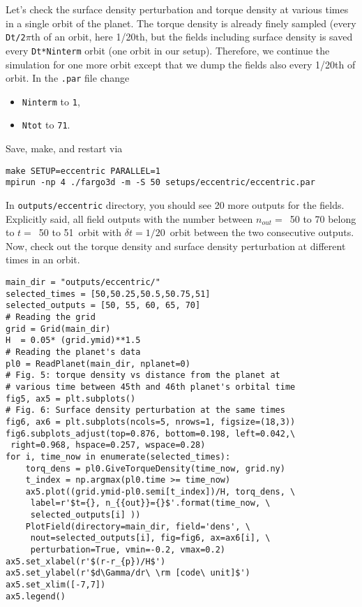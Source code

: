 \documentclass[14pt]{scrartcl}
\begin{document}
Let's check the surface density perturbation and torque density at various times in a single orbit of the planet. The torque density is already finely sampled (every \texttt{Dt/2$\pi$}th of an orbit, here 1/20th, but the fields including surface density is saved every \texttt{Dt*Ninterm} orbit (one orbit in our setup). Therefore, we continue the simulation for one more orbit except that we dump the fields also every 1/20th of orbit. In the \texttt{.par} file change
\begin{itemize}
	\item \texttt{Ninterm} to \texttt{1},
	\item \texttt{Ntot} to \texttt{71}.
\end{itemize} 
Save, make, and restart via 
\begin{verbatim}
make SETUP=eccentric PARALLEL=1
mpirun -np 4 ./fargo3d -m -S 50 setups/eccentric/eccentric.par
\end{verbatim}

In \texttt{outputs/eccentric} directory, you should see 20 more outputs for the fields. Explicitly said, all field outputs with the number between $n_{out}=$~50 to 70 belong to $t=$~50 to 51~orbit with $\delta t=1/20$~orbit between the two consecutive outputs. Now, check out the torque density and surface density perturbation at different times in an orbit.
	\begin{verbatim}
main_dir = "outputs/eccentric/"
selected_times = [50,50.25,50.5,50.75,51]
selected_outputs = [50, 55, 60, 65, 70]
# Reading the grid
grid = Grid(main_dir)
H  = 0.05* (grid.ymid)**1.5
# Reading the planet's data
pl0 = ReadPlanet(main_dir, nplanet=0)
# Fig. 5: torque density vs distance from the planet at 
# various time between 45th and 46th planet's orbital time
fig5, ax5 = plt.subplots()
# Fig. 6: Surface density perturbation at the same times
fig6, ax6 = plt.subplots(ncols=5, nrows=1, figsize=(18,3))
fig6.subplots_adjust(top=0.876, bottom=0.198, left=0.042,\
 right=0.968, hspace=0.257, wspace=0.28)
for i, time_now in enumerate(selected_times):
    torq_dens = pl0.GiveTorqueDensity(time_now, grid.ny)
    t_index = np.argmax(pl0.time >= time_now)
    ax5.plot((grid.ymid-pl0.semi[t_index])/H, torq_dens, \
     label=r'$t={}, n_{{out}}={}$'.format(time_now, \
     selected_outputs[i] ))
    PlotField(directory=main_dir, field='dens', \
     nout=selected_outputs[i], fig=fig6, ax=ax6[i], \
     perturbation=True, vmin=-0.2, vmax=0.2)
ax5.set_xlabel(r'$(r-r_{p})/H$')
ax5.set_ylabel(r'$d\Gamma/dr\ \rm [code\ unit]$')
ax5.set_xlim([-7,7])
ax5.legend()

\end{verbatim}
\end{document}
